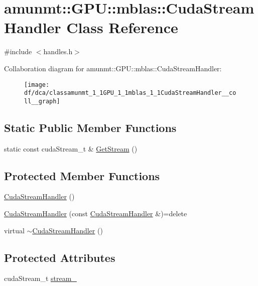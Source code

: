 \hypertarget{classamunmt_1_1GPU_1_1mblas_1_1CudaStreamHandler}{}\section{amunmt\+:\+:G\+PU\+:\+:mblas\+:\+:Cuda\+Stream\+Handler Class Reference}
\label{classamunmt_1_1GPU_1_1mblas_1_1CudaStreamHandler}


{\ttfamily \#include $<$handles.\+h$>$}



Collaboration diagram for amunmt\+:\+:G\+PU\+:\+:mblas\+:\+:Cuda\+Stream\+Handler\+:
\nopagebreak
\begin{figure}[H]
\begin{center}
\leavevmode
\texttt{[image: df/dca/classamunmt\_1\_1GPU\_1\_1mblas\_1\_1CudaStreamHandler\_\_coll\_\_graph]}
\end{center}
\end{figure}
\subsection*{Static Public Member Functions}
\begin{DoxyCompactItemize}
\item 
static const cuda\+Stream\+\_\+t \& \hyperlink{classamunmt_1_1GPU_1_1mblas_1_1CudaStreamHandler_aab9046cda40ac3fed5676d5aa680e6c8}{Get\+Stream} ()
\end{DoxyCompactItemize}
\subsection*{Protected Member Functions}
\begin{DoxyCompactItemize}
\item 
\hyperlink{classamunmt_1_1GPU_1_1mblas_1_1CudaStreamHandler_a27bc1fd24f116d0dee6840c218fdd69c}{Cuda\+Stream\+Handler} ()
\item 
\hyperlink{classamunmt_1_1GPU_1_1mblas_1_1CudaStreamHandler_a35466f2927509a833982499241f502f2}{Cuda\+Stream\+Handler} (const \hyperlink{classamunmt_1_1GPU_1_1mblas_1_1CudaStreamHandler}{Cuda\+Stream\+Handler} \&)=delete
\item 
virtual \hyperlink{classamunmt_1_1GPU_1_1mblas_1_1CudaStreamHandler_a41b033b921d17ea1bdbf8e67bc438272}{$\sim$\+Cuda\+Stream\+Handler} ()
\end{DoxyCompactItemize}
\subsection*{Protected Attributes}
\begin{DoxyCompactItemize}
\item 
cuda\+Stream\+\_\+t \hyperlink{classamunmt_1_1GPU_1_1mblas_1_1CudaStreamHandler_aa819c74e84246a768d62788d9be77ed0}{stream\+\_\+}
\end{DoxyCompactItemize}
